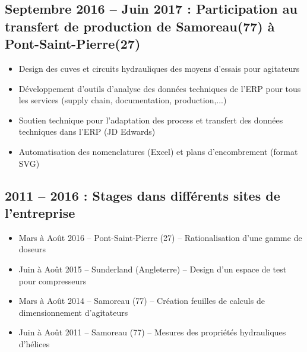 \documentclass[10pt,a4paper,sans]{article}
\begin{document}
\begin{minipage}[t]{0.68\textwidth}
    \subsection{Septembre 2016 -- Juin 2017 : Participation au transfert de production de Samoreau(77) à Pont-Saint-Pierre(27)}
    \begin{itemize}
        \item{Design des cuves et circuits hydrauliques des moyens d’essais pour agitateurs}
        \item{Développement d’outils d’analyse des données techniques de l’ERP pour tous les services (supply chain, documentation, production,...)}
        \item{Soutien technique pour l’adaptation des process et transfert des données techniques dans l’ERP (JD Edwards)}
        \item{Automatisation des nomenclatures (Excel) et plans d’encombrement (format SVG)}
    \end{itemize}


    \subsection{2011 -- 2016 : Stages dans différents sites de l'entreprise}
    \begin{itemize}
        \item{Mars à Août 2016 -- Pont-Saint-Pierre (27) -- Rationalisation d’une gamme de doseurs}
        \item{Juin à Août 2015 -- Sunderland (Angleterre) -- Design d’un espace de test pour compresseurs}
        \item{Mars à Août 2014 -- Samoreau (77) -- Création feuilles de calculs de dimensionnement d’agitateurs}
        \item{Juin à Août 2011 -- Samoreau (77) -- Mesures des propriétés hydrauliques d’hélices}
    \end{itemize}
\end{minipage}
\end{document}
